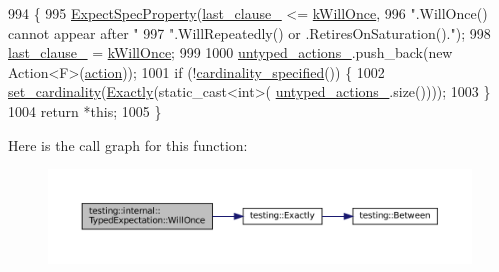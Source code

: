 \begin{DoxyCode}
994                                                       \{
995     \hyperlink{classtesting_1_1internal_1_1ExpectationBase_a652adbe3fcca2950175e3859d59af268}{ExpectSpecProperty}(\hyperlink{classtesting_1_1internal_1_1ExpectationBase_a584f296e53b4cc002ddf5e65e44d72d9}{last\_clause\_} <= \hyperlink{classtesting_1_1internal_1_1ExpectationBase_a450f34b979ec5814c91d4eab6b78cfc2a571cc6a896cd99aa3532f6ab51a51b7a}{kWillOnce},
996                        \textcolor{stringliteral}{".WillOnce() cannot appear after "}
997                        \textcolor{stringliteral}{".WillRepeatedly() or .RetiresOnSaturation()."});
998     \hyperlink{classtesting_1_1internal_1_1ExpectationBase_a584f296e53b4cc002ddf5e65e44d72d9}{last\_clause\_} = \hyperlink{classtesting_1_1internal_1_1ExpectationBase_a450f34b979ec5814c91d4eab6b78cfc2a571cc6a896cd99aa3532f6ab51a51b7a}{kWillOnce};
999 
1000     \hyperlink{classtesting_1_1internal_1_1ExpectationBase_a9558ff6b8b1b7e3a99fac1f93d1826da}{untyped\_actions\_}.push\_back(\textcolor{keyword}{new} Action<F>(\hyperlink{namespaceupload_a675d13c979f1c720866d22ed1736f580}{action}));
1001     \textcolor{keywordflow}{if} (!\hyperlink{classtesting_1_1internal_1_1ExpectationBase_a8c3715b0c44d29eb53148036d9366940}{cardinality\_specified}()) \{
1002       \hyperlink{classtesting_1_1internal_1_1ExpectationBase_a6d416ffd4546ae84de79afb67ad05ada}{set\_cardinality}(\hyperlink{namespacetesting_aa9b1b32ba9e8d3db8ac0af0fc8785c8d}{Exactly}(static\_cast<int>(
      \hyperlink{classtesting_1_1internal_1_1ExpectationBase_a9558ff6b8b1b7e3a99fac1f93d1826da}{untyped\_actions\_}.size())));
1003     \}
1004     \textcolor{keywordflow}{return} *\textcolor{keyword}{this};
1005   \}
\end{DoxyCode}
Here is the call graph for this function\+:
\nopagebreak
\begin{figure}[H]
\begin{center}
\leavevmode
\includegraphics[width=350pt]{classtesting_1_1internal_1_1TypedExpectation_a41b0d15e44e95d52f4d5c310fb9e9683_cgraph}
\end{center}
\end{figure}
\mbox{\label{classtesting_1_1internal_1_1TypedExpectation_a73586c1adb458c5c431df9679e46f5f1}} 
